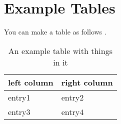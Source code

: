 \section{Example Tables}

You can make a table as follows \cite{ong1997gilbert}.

\begin{table}[ht]
\begin{tabular}{l|l}
\textbf{left column} & \textbf{right column} \\ \hline
entry1 & entry2 \\
entry3 & entry4
\end{tabular}
\caption{An example table with things in it}
\label{tab:my-table}
\end{table}